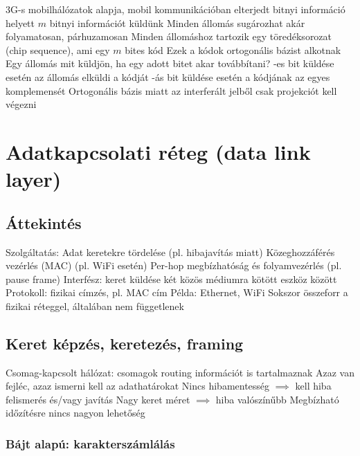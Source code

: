 \documentclass[12pt,a4paper]{article}
\begin{document}
\begin{outline}
	\1 3G-s mobilhálózatok alapja, mobil kommunikációban elterjedt
	 bitnyi információ helyett $m$ bitnyi információt küldünk
	\1 Minden állomás sugározhat akár folyamatosan, párhuzamosan
	\1 Minden állomáshoz tartozik egy töredéksorozat (chip sequence), ami egy $m$ bites kód
		\2 Ezek a kódok ortogonális bázist alkotnak
	\1 Egy állomás mit küldjön, ha egy adott bitet akar továbbítani?
		-es bit küldése esetén az állomás elküldi a kódját
		-ás bit küldése esetén a kódjának az egyes komplemensét
	\1 Ortogonális bázis miatt az interferált jelből csak projekciót kell végezni
\end{outline}

\pagebreak

\section{Adatkapcsolati réteg (data link layer)}

\subsection{Áttekintés}

\begin{outline}
	\1 Szolgáltatás:
		\2 Adat keretekre tördelése (pl. hibajavítás miatt)
		\2 Közeghozzáférés vezérlés (MAC) (pl. WiFi esetén)
		\2 Per-hop megbízhatóság és folyamvezérlés (pl. pause frame)
	\1 Interfész: keret küldése két közös médiumra kötött eszköz között
	\1 Protokoll: fizikai címzés, pl. MAC cím
	\1 Példa: Ethernet, WiFi
	\1 Sokszor összeforr a fizikai réteggel, általában nem függetlenek
\end{outline}

\subsection{Keret képzés, keretezés, framing}

\begin{outline}
	\1 Csomag-kapcsolt hálózat: csomagok routing információt is tartalmaznak
		\2 Azaz van fejléc, azaz ismerni kell az adathatárokat
	\1 Nincs hibamentesség $\implies$ kell hiba felismerés és/vagy javítás
		\2 Nagy keret méret $\implies$ hiba valószínűbb
	\1 Megbízható időzítésre nincs nagyon lehetőség
\end{outline}

\subsubsection{Bájt alapú: karakterszámlálás}
\end{document}
